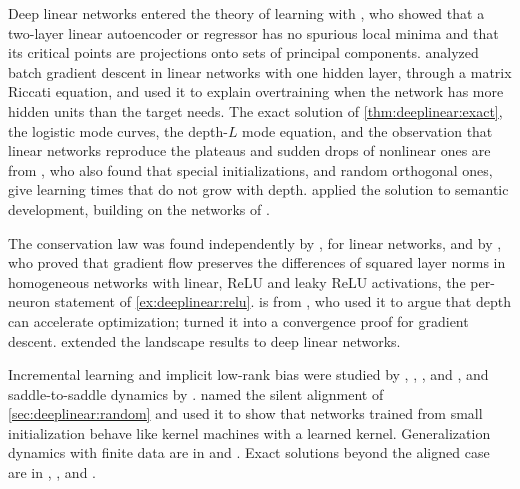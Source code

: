 \begin{refsection}
\notesandrefs
Deep linear networks entered the theory of learning with \textcite{BaldiHornik1989}, who showed that a two-layer linear autoencoder or regressor has no spurious local minima and that its critical points are projections onto sets of principal components. \Textcite{Fukumizu1998} analyzed batch gradient descent in linear networks with one hidden layer, through a matrix Riccati equation, and used it to explain overtraining when the network has more hidden units than the target needs. The exact solution of \cref{thm:deeplinear:exact}, the logistic mode curves, the depth-$L$ mode equation, and the observation that linear networks reproduce the plateaus and sudden drops of nonlinear ones are from \textcite{SaxeEtAl2014}, who also found that special initializations, and random orthogonal ones, give learning times that do not grow with depth. \Textcite{SaxeEtAl2019} applied the solution to semantic development, building on the networks of \textcite{RogersMcClelland2004}.

The conservation law was found independently by \textcite{AroraCohenHazan2018}, for linear networks, and by \textcite{DuHuLee2018}, who proved that gradient flow preserves the differences of squared layer norms in homogeneous networks with linear, ReLU and leaky ReLU activations, the per-neuron statement of \cref{ex:deeplinear:relu}.  is from \textcite{AroraCohenHazan2018}, who used it to argue that depth can accelerate optimization; \textcite{AroraEtAl2019conv} turned it into a convergence proof for gradient descent. \Textcite{Kawaguchi2016} extended the landscape results to deep linear networks.

Incremental learning and implicit low-rank bias were studied by \textcite{GidelEtAl2019}, \textcite{GissinEtAl2020}, \textcite{AroraEtAl2019}, \textcite{RazinCohen2020} and \textcite{LiLuoLyu2021}, and saddle-to-saddle dynamics by \textcite{JacotEtAl2021}. \Textcite{AtanasovEtAl2022} named the silent alignment of \cref{sec:deeplinear:random} and used it to show that networks trained from small initialization behave like kernel machines with a learned kernel. Generalization dynamics with finite data are in \textcite{AdvaniEtAl2020} and \textcite{LampinenGanguli2019}. Exact solutions beyond the aligned case are in \textcite{TarmounEtAl2021}, \textcite{BraunEtAl2022}, \textcite{DomineEtAl2025} and \textcite{KuninEtAl2024}.


\end{refsection}
